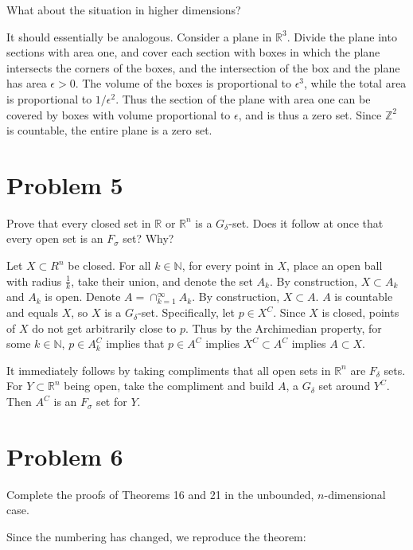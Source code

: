 \documentclass{article}
\newcommand{\R}{\mathbb{R}}
\newcommand{\Z}{\mathbb{Z}}
\newcommand{\N}{\mathbb{N}}
\begin{document}
What about the situation in higher dimensions?

It should essentially be analogous. Consider a plane in $\R^3$.  Divide the plane into sections with area one, and cover each section with boxes in which the plane intersects the corners of the boxes, and the intersection of the box and the plane has area $\epsilon > 0$. The volume of the boxes is proportional to $\epsilon^3$, while the total area is proportional to $1/\epsilon^2$. Thus the section of the plane with area one can be covered by boxes with volume proportional to $\epsilon$, and is thus a zero set. Since $\Z^2$ is countable, the entire plane is a zero set.

\section*{Problem 5}

Prove that every closed set in $\R$ or $\R^n$ is a $G_\delta$-set. Does it follow at once that every open set is an $F_\sigma$ set? Why?

Let $X \subset R^n$ be closed. For all $k \in \N$, for every point in $X$, place an open ball with radius $\frac{1}{k}$, take their union, and denote the set $A_k$. By construction, $X \subset A_k$ and $A_k$ is open. Denote $A = \cap_{k=1}^\infty A_k$. By construction, $X \subset A$. $A$ is countable and equals $X$, so $X$ is a $G_\delta$-set. Specifically, let $p \in X^C$. Since $X$ is closed, points of $X$ do not get arbitrarily close to $p$. Thus by the Archimedian property, for some $k \in \N$, $p \in A_k^C$ implies that $p \in A^C$ implies $X^C \subset A^C$ implies $A \subset X$.

It immediately follows by taking compliments that all open sets in $\R^n$ are $F_\delta$ sets. For $Y \subset \R^n$ being open, take the compliment and build $A$, a $G_\delta$ set around $Y^C$. Then $A^C$ is an $F_\sigma$ set for $Y$.

\section*{Problem 6}

Complete the proofs of Theorems 16 and 21 in the unbounded, $n$-dimensional case.

Since the numbering has changed, we reproduce the theorem:
\end{document}
